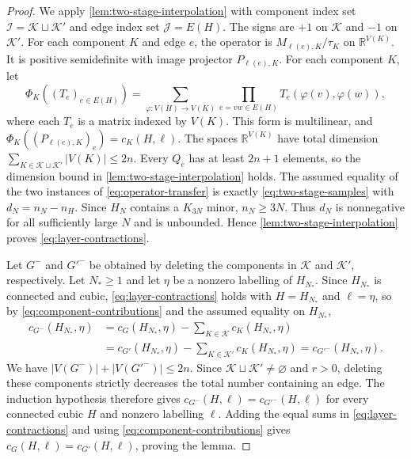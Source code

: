 \documentclass[11pt,a4paper]{article}
\theoremstyle{plain}
\theoremstyle{definition}
\newcommand{\R}{\mathbb{R}}
\begin{document}
\begin{proof}
We apply \cref{lem:two-stage-interpolation} with component index set
$\mathcal I=\mathcal K\sqcup\mathcal K'$ and edge index set $\mathcal J=E(H)$.
The signs are $+1$ on $\mathcal K$ and $-1$ on $\mathcal K'$.
For each component $K$ and edge $e$, the operator is
$M_{\ell(e),K}/\tau_K$ on $\R^{V(K)}$.
It is positive semidefinite with image projector $P_{\ell(e),K}$.
For each component $K$, let
\begin{equation}\label{eq:component-multilinear-form}
 \Phi_K((T_e)_{e\in E(H)})
 =\sum_{\varphi:V(H)\to V(K)}
   \prod_{e=vw\in E(H)}T_e(\varphi(v),\varphi(w)),
\end{equation}
where each $T_e$ is a matrix indexed by $V(K)$.
This form is multilinear, and $\Phi_K((P_{\ell(e),K})_e)=c_K(H,\ell)$.
The spaces $\R^{V(K)}$ have total dimension
$\sum_{K\in\mathcal K\sqcup\mathcal K'}|V(K)|\leq2n$.
Every $Q_e$ has at least $2n+1$ elements, so the dimension bound
in \cref{lem:two-stage-interpolation} holds.
The assumed equality of the two instances of \cref{eq:operator-transfer}
is exactly \cref{eq:two-stage-samples} with $d_N=n_N-n_H$.
Since $H_N$ contains a $K_{3N}$ minor, $n_N\geq3N$.
Thus $d_N$ is nonnegative for all sufficiently large $N$ and is unbounded.
Hence \cref{lem:two-stage-interpolation} proves \cref{eq:layer-contractions}.

Let $G^-$ and $G'^-$ be obtained by deleting the components in
$\mathcal K$ and $\mathcal K'$, respectively.
Let $N_\ast\geq1$ and let $\eta$ be a nonzero labelling of $H_{N_\ast}$.
Since $H_{N_\ast}$ is connected and cubic, \cref{eq:layer-contractions} holds
with $H=H_{N_\ast}$ and $\ell=\eta$, so by \cref{eq:component-contributions}
and the assumed equality on $H_{N_\ast}$,
\begin{equation}\label{eq:residual-contractions}
 \begin{aligned}
 c_{G^-}(H_{N_\ast},\eta)
 &=c_G(H_{N_\ast},\eta)-\sum_{K\in\mathcal K}c_K(H_{N_\ast},\eta)\\
 &=c_{G'}(H_{N_\ast},\eta)-\sum_{K\in\mathcal K'}c_K(H_{N_\ast},\eta)
 =c_{G'^-}(H_{N_\ast},\eta).
 \end{aligned}
\end{equation}
We have $|V(G^-)|+|V(G'^-)|\leq2n$.
Since $\mathcal K\sqcup\mathcal K'\ne\varnothing$ and $r>0$, deleting
these components strictly decreases the total number containing an edge.
The induction hypothesis therefore gives
$c_{G^-}(H,\ell)=c_{G'^-}(H,\ell)$ for every connected cubic $H$ and
nonzero labelling $\ell$.
Adding the equal sums in \cref{eq:layer-contractions} and using
\cref{eq:component-contributions} gives $c_G(H,\ell)=c_{G'}(H,\ell)$,
proving the lemma.
\end{proof}
\end{document}
